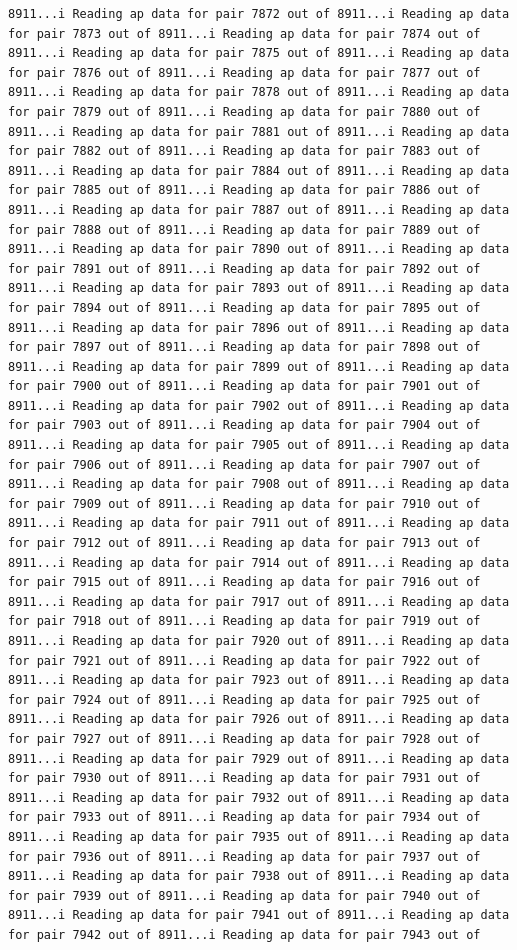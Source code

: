 \documentclass[
]{article}
\begin{document}
\begin{verbatim}
8911...i Reading ap data for pair 7872 out of 8911...i Reading ap data for pair 7873 out of 8911...i Reading ap data for pair 7874 out of 8911...i Reading ap data for pair 7875 out of 8911...i Reading ap data for pair 7876 out of 8911...i Reading ap data for pair 7877 out of 8911...i Reading ap data for pair 7878 out of 8911...i Reading ap data for pair 7879 out of 8911...i Reading ap data for pair 7880 out of 8911...i Reading ap data for pair 7881 out of 8911...i Reading ap data for pair 7882 out of 8911...i Reading ap data for pair 7883 out of 8911...i Reading ap data for pair 7884 out of 8911...i Reading ap data for pair 7885 out of 8911...i Reading ap data for pair 7886 out of 8911...i Reading ap data for pair 7887 out of 8911...i Reading ap data for pair 7888 out of 8911...i Reading ap data for pair 7889 out of 8911...i Reading ap data for pair 7890 out of 8911...i Reading ap data for pair 7891 out of 8911...i Reading ap data for pair 7892 out of 8911...i Reading ap data for pair 7893 out of 8911...i Reading ap data for pair 7894 out of 8911...i Reading ap data for pair 7895 out of 8911...i Reading ap data for pair 7896 out of 8911...i Reading ap data for pair 7897 out of 8911...i Reading ap data for pair 7898 out of 8911...i Reading ap data for pair 7899 out of 8911...i Reading ap data for pair 7900 out of 8911...i Reading ap data for pair 7901 out of 8911...i Reading ap data for pair 7902 out of 8911...i Reading ap data for pair 7903 out of 8911...i Reading ap data for pair 7904 out of 8911...i Reading ap data for pair 7905 out of 8911...i Reading ap data for pair 7906 out of 8911...i Reading ap data for pair 7907 out of 8911...i Reading ap data for pair 7908 out of 8911...i Reading ap data for pair 7909 out of 8911...i Reading ap data for pair 7910 out of 8911...i Reading ap data for pair 7911 out of 8911...i Reading ap data for pair 7912 out of 8911...i Reading ap data for pair 7913 out of 8911...i Reading ap data for pair 7914 out of 8911...i Reading ap data for pair 7915 out of 8911...i Reading ap data for pair 7916 out of 8911...i Reading ap data for pair 7917 out of 8911...i Reading ap data for pair 7918 out of 8911...i Reading ap data for pair 7919 out of 8911...i Reading ap data for pair 7920 out of 8911...i Reading ap data for pair 7921 out of 8911...i Reading ap data for pair 7922 out of 8911...i Reading ap data for pair 7923 out of 8911...i Reading ap data for pair 7924 out of 8911...i Reading ap data for pair 7925 out of 8911...i Reading ap data for pair 7926 out of 8911...i Reading ap data for pair 7927 out of 8911...i Reading ap data for pair 7928 out of 8911...i Reading ap data for pair 7929 out of 8911...i Reading ap data for pair 7930 out of 8911...i Reading ap data for pair 7931 out of 8911...i Reading ap data for pair 7932 out of 8911...i Reading ap data for pair 7933 out of 8911...i Reading ap data for pair 7934 out of 8911...i Reading ap data for pair 7935 out of 8911...i Reading ap data for pair 7936 out of 8911...i Reading ap data for pair 7937 out of 8911...i Reading ap data for pair 7938 out of 8911...i Reading ap data for pair 7939 out of 8911...i Reading ap data for pair 7940 out of 8911...i Reading ap data for pair 7941 out of 8911...i Reading ap data for pair 7942 out of 8911...i Reading ap data for pair 7943 out of 
\end{verbatim}
\end{document}
